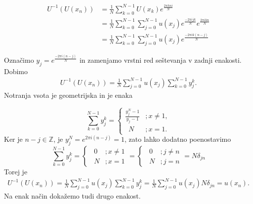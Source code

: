 \documentclass[mat2, tisk]{fmfdelo}
\newcommand{\Z}{\mathbb Z}
\begin{document}
\begin{dokaz}
\begin{align*}
  U^{-1}(U(x_n)) &= \frac{1}{N}\sum_{k=0}^{N-1} U(x_k) e^{\frac{2\pi k n i}{N}} \\
  &= \frac{1}{N}\sum_{k=0}^{N-1} \sum_{j=0}^{N-1} u(x_j) e^{\frac{-2\pi i j k}{N}} e^{\frac{2\pi i k n }{N}} \\
  &= \frac{1}{N}\sum_{k=0}^{N-1} \sum_{j=0}^{N-1} u(x_j) e^{\frac{-2\pi i k(n - j)}{N}}
\end{align*}

Označimo $y_j = e^{\frac{-2\pi i (n-j)}{N}}$ in zamenjamo vrstni red seštevanja v 
zadnji enakosti. Dobimo
\begin{align*}
  U^{-1}(U(x_n)) = \frac{1}{N}\sum_{j=0}^{N-1} u(x_j)\sum_{k=0}^{N-1} y_j^k .
\end{align*}
Notranja vsota je geometrijska in je enaka

\[ 
  \sum_{k=0}^{N-1} y_j^k = \begin{cases} 
      \frac{y_j^N - 1}{y_j - 1} &; x\neq 1, \\
      \,\,\,N &; x = 1.
   \end{cases}
\]
Ker je $n-j \in \Z$, je $y_j^N = e^{2\pi i(n-j)} = 1$, zato lahko dodatno
poenostavimo  
\[ 
  \sum_{k=0}^{N-1} y_j^k = \begin{cases} 
      \,\,\,0 &; x\neq 1 \\
      \,\,\,N &; x = 1 
   \end{cases}
   = 
   \begin{cases} 
    \,\,\,0 &; j\neq n \\
    \,\,\,N &; j=n 
 \end{cases}
 = N\delta_{jn}
\]
Torej je
\begin{align*}
  U^{-1}(U(x_n)) = \frac{1}{N}\sum_{j=0}^{N-1} u(x_j)\sum_{k=0}^{N-1} y_j^k = \frac{1}{N} \sum_{j=0}^{N-1} u(x_j) N\delta_{jn} = u(x_n). 
\end{align*}
Na enak način dokažemo tudi drugo enakost.
\end{dokaz}
\end{document}
